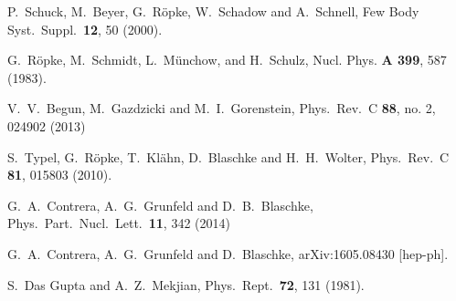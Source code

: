 \documentclass[epj]{svjour}
\begin{document}
\begin{thebibliography}{9}

  P.~Schuck, M.~Beyer, G.~R\"opke, W.~Schadow and A.~Schnell,
  Few Body Syst.\ Suppl.\  {\bf 12}, 50 (2000).

G.~R\"opke, M.~Schmidt, L.~M\"unchow, and H.~Schulz,
Nucl. Phys. {\bf A 399}, 587 (1983).
 
  V.~V.~Begun, M.~Gazdzicki and M.~I.~Gorenstein,
  Phys.\ Rev.\ C {\bf 88}, no. 2, 024902 (2013)

  S.~Typel, G.~R\"opke, T.~Kl\"ahn, D.~Blaschke and H.~H.~Wolter,
  Phys.\ Rev.\ C {\bf 81}, 015803 (2010).


  G.~A.~Contrera, A.~G.~Grunfeld and D.~B.~Blaschke,
  Phys.\ Part.\ Nucl.\ Lett.\  {\bf 11}, 342 (2014)

  G.~A.~Contrera, A.~G.~Grunfeld and D.~Blaschke,
  arXiv:1605.08430 [hep-ph].



  S.~Das Gupta and A.~Z.~Mekjian,
  Phys.\ Rept.\  {\bf 72}, 131 (1981).


\end{thebibliography}
\end{document}
